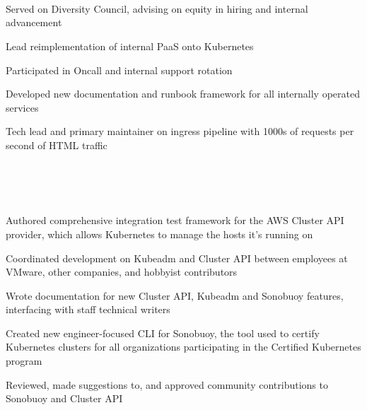 \documentclass[letterpaper,11pt,notitlepage]{article}
\begin{document}

\vbar
{}
         \\
         \\
         \\
        \begin{employment}
          \item Served on Diversity Council, advising on equity in hiring and internal advancement
          \item Lead reimplementation of internal PaaS onto Kubernetes
          \item Participated in Oncall and internal support rotation
          \item Developed new documentation and runbook framework for all internally operated services
          \item Tech lead and primary maintainer on ingress pipeline with 1000s of requests per second of HTML traffic
       \end{employment}
         \\
         \\
         \\
        \begin{employment}
          \item Authored comprehensive integration test framework for the
            AWS Cluster API provider, which allows Kubernetes to manage the hosts it's running on
          \item Coordinated development on Kubeadm and Cluster API between
            employees at VMware, other companies, and hobbyist contributors
          \item Wrote documentation for new Cluster API, Kubeadm and Sonobuoy
            features, interfacing with staff technical writers
          \item Created new engineer-focused CLI for Sonobuoy, the tool used to certify Kubernetes clusters
                for all organizations participating in the Certified Kubernetes program
          \item Reviewed, made suggestions to, and approved community contributions to Sonobuoy and Cluster API
        \end{employment}
\end{document}
